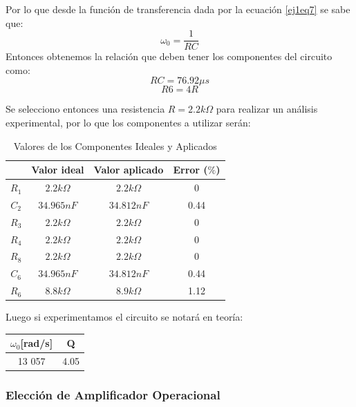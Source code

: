 Por lo que desde la función de transferencia dada por la ecuación \ref{ej1eq7} se sabe que:
$$\omega_0 = \frac{1}{RC}$$
Entonces obtenemos la relación que deben tener los componentes del circuito como:
$$RC = 76. 92\mu s$$
$$R6 = 4R$$

Se selecciono entonces una resistencia $R = 2.2k\Omega$ para realizar un análisis experimental, por lo que los componentes a utilizar serán:
\begin{table}[H]
	\centering
	\begin{tabular}{|c|c|c|c|}
		\hline
		           		& Valor ideal                              & Valor aplicado                      	& Error ($\%$) 	\\ \hline \hline
		$R_1$      		& $2.2k\Omega$                        & $2.2k\Omega$                       	& 0            	\\ \hline
		$C_2$      		& $34.965nF$				& $34.812nF$               		& 0.44         	\\ \hline
		$R_3$      		& $2.2k\Omega$                        & $2.2k\Omega$                       & 0            	\\ \hline
		$R_4$      		& $2.2k\Omega$                        & $2.2k\Omega$                       & 0            	\\ \hline
		$R_8$      		& $2.2k\Omega$                        & $2.2k\Omega$                       & 0            	\\ \hline
		$C_6$      		& $34.965nF$ 				& $34.812nF$               		& 0.44         	\\ \hline
		$R_6$      		& $8.8k\Omega$                      	& $8.9k\Omega$       			& 1.12            	\\ \hline
	\end{tabular}
	\caption{Valores de los Componentes Ideales y Aplicados}
\end{table}
Luego si experimentamos el circuito se notará en teoría:
\begin{table}[h]
\centering
\begin{tabular}{cc}
\hline
$\omega_0${[}rad/s{]} & Q    \\ \hline
13 057        & 4.05 \\ \hline
\end{tabular}
\end{table}

\subsubsection{Elección de Amplificador Operacional}

